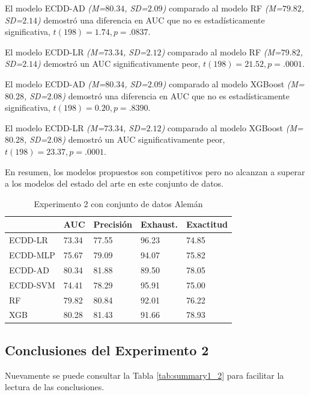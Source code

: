 El modelo ECDD-AD \textit{(M=$80.34$, SD=$2.09$)} comparado al modelo \ac{RF} \textit{(M=$79.82$, SD=$2.14$)} demostró una diferencia en \ac{AUC} que no es estadísticamente significativa, $t(198)=1.74, p=.0837$.

El modelo ECDD-LR  \textit{(M=$73.34$, SD=$2.12$)} comparado al modelo \ac{RF} \textit{(M=$79.82$, SD=$2.14$)} demostró un \ac{AUC} significativamente peor, $t(198)=21.52, p=.0001$.

El modelo ECDD-AD \textit{(M=$80.34$, SD=$2.09$)} comparado al modelo \ac{XGBoost} \textit{(M=$80.28$, SD=$2.08$)} demostró una diferencia en \ac{AUC} que no es estadísticamente significativa, $t(198)=0.20, p=.8390$.

El modelo ECDD-LR \textit{(M=$73.34$, SD=$2.12$)} comparado al modelo \ac{XGBoost} \textit{(M=$80.28$, SD=$2.08$)} demostró un \ac{AUC} significativamente peor, $t(198)=23.37, p=.0001$.

En resumen, los modelos propuestos son competitivos pero no alcanzan a superar a los modelos del estado del arte en este conjunto de datos.

\begin{table}[htbp]
\centering
\caption{Experimento 2 con conjunto de datos Alemán}
\label{tab:german-proc2}
\begin{tabularx}{0.75\textwidth}{|l|Y Y Y Y|}
				\hline
				& AUC		& Precisión	& Exhaust.		& Exactitud	\\
				\hline
ECDD-LR			& 73.34		& 77.55		& 96.23			& 74.85		\\		%
ECDD-MLP		& 75.67		& 79.09		& 94.07			& 75.82		\\		%
ECDD-AD			& 80.34		& 81.88		& 89.50			& 78.05		\\		%
ECDD-SVM		& 74.41		& 78.29		& 95.91			& 75.00		\\		%
				\hline
RF				& 79.82		& 80.84		& 92.01			& 76.22		\\		%
XGB				& 80.28		& 81.43		& 91.66			& 78.93		\\		%
				\hline
\end{tabularx}
\end{table}

\subsection{Conclusiones del Experimento 2}

Nuevamente se puede consultar la Tabla \ref{tab:summary1_2} para facilitar la lectura de las conclusiones.

